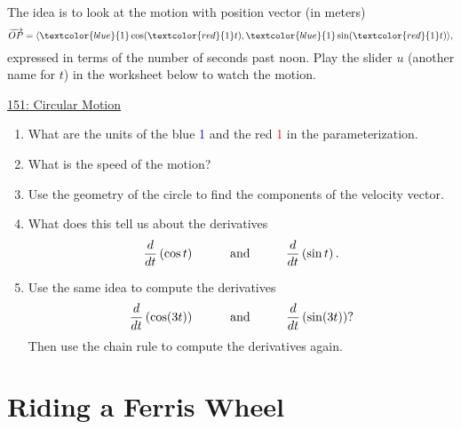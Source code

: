 \documentclass{ximera}
\begin{document}
\begin{example} \label{ExPODfdsfLMV}
 
The idea is to look at the motion with position vector (in meters)
\[
   \overrightarrow{OP} = \langle \textcolor{blue}{1} \cos (\textcolor{red}{1} t) , \textcolor{blue}{1} \sin (\textcolor{red}{1} t) \rangle,
\]
expressed in terms of the number of seconds past noon. Play the slider $u$ (another name for $t$) in the worksheet below to watch the motion.


\begin{onlineOnly}
    \begin{center}
\end{center}
\end{onlineOnly}

\href{https://www.desmos.com/calculator/ov0azsjucq}{151: Circular Motion}

\begin{enumerate}
\item What are the units of the blue \textcolor{blue}{1} and the red \textcolor{red}{1} in the parameterization.

\item What is the speed of the motion?

\item Use the geometry of the circle to find the components of the velocity vector.

\item What does this tell us about the derivatives 
\[
     \frac{d}{dt} \left( \cos t \right)  \hskip 0.4 in \text{and}  \hskip 0.4 in \frac{d}{dt} \left( \sin t \right) .
\]

\item Use the same idea to compute the derivatives
\[
     \frac{d}{dt} \left( \cos (3t) \right)  \hskip 0.4 in \text{and}  \hskip 0.4 in \frac{d}{dt} \left( \sin(3t) \right) ?
\]
Then use the chain rule to compute the derivatives again.

\end{enumerate}
\end{example}

\section{Riding a Ferris Wheel}
\end{document}
